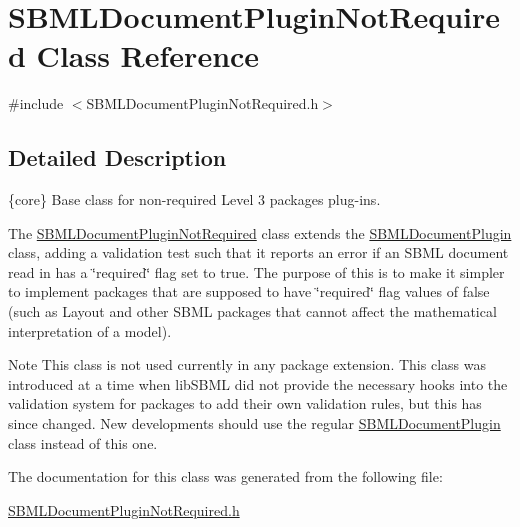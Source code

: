 \hypertarget{class_s_b_m_l_document_plugin_not_required}{}\section{S\+B\+M\+L\+Document\+Plugin\+Not\+Required Class Reference}
\label{class_s_b_m_l_document_plugin_not_required}


{\ttfamily \#include $<$S\+B\+M\+L\+Document\+Plugin\+Not\+Required.\+h$>$}



\subsection{Detailed Description}
\{core\} Base class for non-\/required Level 3 packages plug-\/ins.



The \hyperlink{class_s_b_m_l_document_plugin_not_required}{S\+B\+M\+L\+Document\+Plugin\+Not\+Required} class extends the \hyperlink{class_s_b_m_l_document_plugin}{S\+B\+M\+L\+Document\+Plugin} class, adding a validation test such that it reports an error if an S\+B\+ML document read in has a \char`\"{}required\char`\"{} flag set to {\ttfamily true}. The purpose of this is to make it simpler to implement packages that are supposed to have \char`\"{}required\char`\"{} flag values of {\ttfamily false} (such as Layout and other S\+B\+ML packages that cannot affect the mathematical interpretation of a model).

\begin{DoxyNote}{Note}
This class is not used currently in any package extension. This class was introduced at a time when lib\+S\+B\+ML did not provide the necessary hooks into the validation system for packages to add their own validation rules, but this has since changed. New developments should use the regular \hyperlink{class_s_b_m_l_document_plugin}{S\+B\+M\+L\+Document\+Plugin} class instead of this one. 
\end{DoxyNote}


The documentation for this class was generated from the following file\+:\begin{DoxyCompactItemize}
\item 
\hyperlink{_s_b_m_l_document_plugin_not_required_8h}{S\+B\+M\+L\+Document\+Plugin\+Not\+Required.\+h}\end{DoxyCompactItemize}
